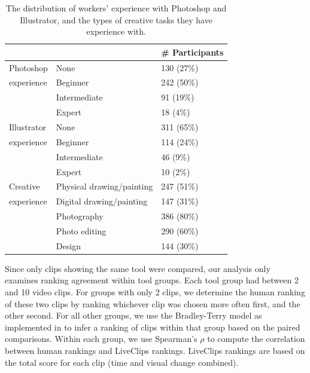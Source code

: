 \begin{table}[t!]
\small
\centering
\caption{The distribution of workers' experience with Photoshop and Illustrator, and the types of creative tasks they have experience with.}
\label{table:liveclips_experience}
\begin{tabular}{lll}
            &                           & \# Participants \\ \hline
Photoshop   & None                      & 130 (27\%)       \\
experience  & Beginner                  & 242 (50\%)      \\
            & Intermediate              & 91 (19\%)       \\
            & Expert                    & 18 (4\%)        \\ \hline
Illustrator & None                      & 311 (65\%)      \\
experience  & Beginner                  & 114 (24\%)      \\
            & Intermediate              & 46 (9\%)       \\
            & Expert                    & 10 (2\%)        \\ \hline
Creative    & Physical drawing/painting & 247 (51\%)      \\
experience  & Digital drawing/painting  & 147 (31\%)      \\
            & Photography               & 386 (80\%)      \\
            & Photo editing             & 290 (60\%)      \\
            & Design                    & 144 (30\%)     
\end{tabular}
\end{table}

Since only clips showing the same tool were compared, our analysis only examines ranking agreement within tool groups. Each tool group had between 2 and 10 video clips. For groups with only 2 clips, we determine the human ranking of these two clips by ranking whichever clip was chosen more often first, and the other second. For all other groups, we use the Bradley-Terry model as implemented in \cite{Maystre2015} to infer a ranking of clips within that group based on the paired comparisons. Within each group, we use Spearman's $\rho$ to compute the correlation between human rankings and LiveClips rankings. LiveClips rankings are based on the total score for each clip (time and visual change combined).

